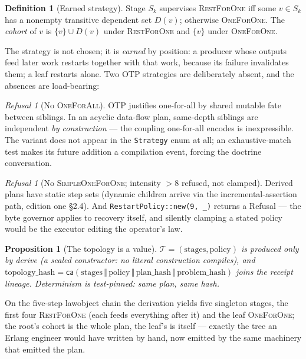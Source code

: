 \documentclass[11pt,a4paper]{article}
\newtheorem{proposition}[theorem]{Proposition}
\theoremstyle{definition}
\newtheorem{definition}[theorem]{Definition}
\theoremstyle{remark}
\newtheorem{refusal}[theorem]{Refusal}
\newcommand{\ca}{\mathsf{ca}}
\newcommand{\Topo}{\mathcal{T}}
\begin{document}
\begin{definition}[Earned strategy]
Stage $S_k$ supervises \textsc{RestForOne} iff some $v \in S_k$ has a
nonempty transitive dependent set $D(v)$; otherwise \textsc{OneForOne}.
The \emph{cohort} of $v$ is $\{v\} \cup D(v)$ under \textsc{RestForOne}
and $\{v\}$ under \textsc{OneForOne}.
\end{definition}

The strategy is not chosen; it is \emph{earned} by position: a producer
whose outputs feed later work restarts together with that work, because
its failure invalidates them; a leaf restarts alone. Two OTP strategies
are deliberately absent, and the absences are load-bearing:

\begin{refusal}[No \textsc{OneForAll}]
OTP justifies one-for-all by shared mutable fate between siblings. In an
acyclic data-flow plan, same-depth siblings are independent \emph{by
construction} --- the coupling one-for-all encodes is inexpressible. The
variant does not appear in the \texttt{Strategy} enum at all; an
exhaustive-match test makes its future addition a compilation event,
forcing the doctrine conversation.
\end{refusal}

\begin{refusal}[No \textsc{SimpleOneForOne}; intensity $> 8$ refused, not clamped]
Derived plans have static step sets (dynamic children arrive via the
incremental-assertion path, edition one \S2.4). And
\texttt{RestartPolicy::new(9, \_)} returns a \textsf{Refusal} --- the byte
governor applies to recovery itself, and silently clamping a stated policy
would be the executor editing the operator's law.
\end{refusal}

\begin{proposition}[The topology is a value]
$\Topo = (\mathrm{stages}, \mathrm{policy})$ is produced only by
\textsf{derive} (a sealed constructor: no literal construction compiles),
and $\mathrm{topology\_hash} = \ca(\mathrm{stages} \,\Vert\,
\mathrm{policy} \,\Vert\, \mathrm{plan\_hash} \,\Vert\,
\mathrm{problem\_hash})$ joins the receipt lineage. Determinism is
test-pinned: same plan, same hash.
\end{proposition}

On the five-step lawobject chain the derivation yields five singleton
stages, the first four \textsc{RestForOne} (each feeds everything after
it) and the leaf \textsc{OneForOne}; the root's cohort is the whole plan,
the leaf's is itself --- exactly the tree an Erlang engineer would have
written by hand, now emitted by the same machinery that emitted the plan.
\end{document}
